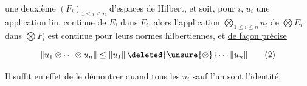   une  deuxième 
$(F_i)_{1\leq i\leq n}$ d'espaces de Hilbert, et soit, pour  $i$,  $u_i$ une application
lin. continue de $E_i$ dans $F_i$, alors l'application
$\bigotimes_{1\leq i\leq n}u_i$ de $\bigotimes E_i$ dans $\bigotimes F_i$ est continue
pour leurs normes hilbertiennes, et \uline{de façon précise}

\[
\|u_1\otimes\cdots\otimes u_n\|\leq\|u_1\|\,\deleted{\unsure{\otimes}}\cdots\|u_n\| \tag*{(2)}
\]

Il suffit en effet de le démontrer quand tous les $u_i$
sauf l'un sont l'identité. 

